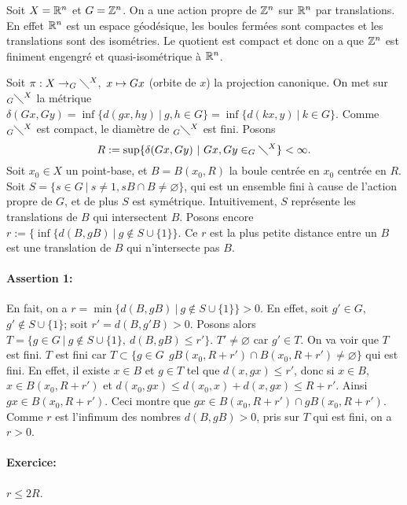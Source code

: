   \begin{ex}
    Soit $X = \mathbb{R}^n$ et $G = \mathbb{Z}^n$. On a une action propre de $\mathbb{Z}^n$ sur $\mathbb{R}^n$ par translations. En effet
    $\mathbb{R}^n$ est un espace géodésique, les boules fermées sont compactes et les translations sont des
    isométries. Le quotient est compact et donc on a que $\mathbb{Z}^n$ est finiment engengré et quasi-isométrique à
    $\mathbb{R}^n$. 
  \end{ex}

  \begin{preuve}
    Soit $\pi: X \to _G\diagdown^X,\ x \mapsto Gx$ (orbite de $x$) la projection canonique. On met sur
    $_G\diagdown^X$ la métrique $\delta(Gx, Gy) = \inf\{d(gx,hy)\ |\ g,h \in G\} = \inf\{ d(kx, y)\ |\ k \in
    G\}$. Comme $_G\diagdown^X$ est compact, le diamètre de $_G\diagdown^X$ est fini. Posons
      \[R := \sup\{\delta(Gx, Gy)\ |\ Gx, Gy \in _G\diagdown^X \} < \infty.\]
    Soit $x_0 \in X$ un point-base, et $B = B(x_0, R)$ la boule centrée en $x_0$ centrée en $R$. Soit $S = \{s
    \in G\ |\ s \neq 1, sB \cap B \neq \varnothing\}$, qui est un ensemble fini à cause de l'action propre de
    $G$, et de plus $S$ est symétrique. Intuitivement, $S$ représente les translations de $B$ qui intersectent
    $B$. Posons encore $r := \{ \inf\{ d(B, gB)\ |\ g \notin S \cup \{1\}\}$. Ce $r$ est la plus petite
    distance entre un $B$ est une translation de $B$  qui n'intersecte pas $B$.

    \paragraph{Assertion 1:} En fait, on a $r = \min\{ d(B, gB)\ |\ g \notin S \cup \{1\}\} > 0$. En effet,
    soit $g' \in G$, $g' \notin S \cup \{1\}$; soit $r' = d(B, g'B) > 0$. Posons alors $T = \{g \in G\ |\ g
    \notin S \cup \{1\},\ d(B, gB) \leq r'\}$. $T' \neq \varnothing$ car $g' \in T$. On va voir que $T$ est
    fini. $T$ est fini car $T \subset \{g \in G\ \ gB(x_0, R+r') \cap B(x_0, R+r') \neq \varnothing\}$ qui est
    fini. En effet, il existe $x \in B$ et $g \in T$ tel que $d(x, gx) \leq r'$, donc si $x \in B$, $x \in
    B(x_0, R+r')$ et $d(x_0, gx) \leq d(x_0, x) + d(x, gx) \leq R + r'$. Ainsi $gx \in B(x_0, R+r')$. Ceci
    montre que $gx \in B(x_0, R+r') \cap gB(x_0, R + r')$. Comme $r$ est l'infimum des nombres $d(B, gB) > 0$,
    pris sur $T$ qui est fini, on a $r > 0$.

    \paragraph{Exercice:} $r \leq 2R$.


\end{preuve}
